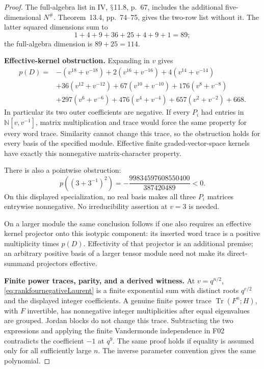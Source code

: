 \documentclass[11pt,a4paper]{article}
\renewcommand{\S}{\ensuremath{\mathsection}}
\newcommand{\fid}[1]{\textsf{#1}}\newcommand{\gate}[1]{\textsf{#1}}
\theoremstyle{named}\newtheorem{finding}{Finding}[section]
\theoremstyle{definition}\newtheorem{definition}[finding]{Definition}
\theoremstyle{remark}\newtheorem{remark}[finding]{Remark}
\begin{document}
\begin{proof}
The full-algebra list in IV, \S11.8, p.~67, includes
the additional five-dimensional \(N^\#\).
Theorem~13.4, pp.~74--75, gives the two-row list without it.
The latter squared dimensions sum to
\[
 1+4+9+36+25+4+9+1=89;
\]
the full-algebra dimension is \(89+25=114\).

\par\smallskip\noindent\textbf{Effective-kernel obstruction.}\quad
Expanding in \(v\) gives
\begin{equation}\label{eq:rankfournegativeLaurent}
\begin{split}
p(D)={}&-(v^{18}+v^{-18})+2(v^{16}+v^{-16})
 +4(v^{14}+v^{-14})\\
&+36(v^{12}+v^{-12})+67(v^{10}+v^{-10})
 +176(v^8+v^{-8})\\
&+297(v^6+v^{-6})+476(v^4+v^{-4})
 +657(v^2+v^{-2})+668.
\end{split}
\end{equation}
In particular its two outer coefficients are negative.
If every \(P_i\) had entries in
\(\mathbb N[v,v^{-1}]\), matrix multiplication and trace
would force the same property for every word trace.
Similarity cannot change this trace, so the obstruction
holds for every basis of the specified module.
Effective finite graded-vector-space kernels have exactly
this nonnegative matrix-character property.

There is also a pointwise obstruction:
\[
 p((3+3^{-1})^2)
 =-\frac{99834597608550400}{387420489}<0.
\]
On this displayed specialization, no real basis makes all
three \(P_i\) matrices entrywise nonnegative.
No irreducibility assertion at \(v=3\) is needed.

On a larger module the same conclusion follows if one also
requires an effective kernel projector onto this isotypic
component: its inserted word trace is a positive multiplicity
times \(p(D)\).
Effectivity of that projector is an additional premise;
an arbitrary positive basis of a larger tensor module
need not make its direct-summand projectors effective.

\par\smallskip\noindent\textbf{Finite power traces, parity, and a derived witness.}\quad
At \(v=q^{n/2}\),
\eqref{eq:rankfournegativeLaurent} is a finite exponential
sum with distinct roots \(q^{e/2}\) and the displayed
integer coefficients.
A genuine finite power trace
\(\operatorname{Tr}(F^n;H)\), with \(F\) invertible,
has nonnegative integer multiplicities after equal
eigenvalues are grouped. Jordan blocks do not change this
trace.
Subtracting the two expressions and applying the finite
Vandermonde independence in \fid{F02} contradicts the
coefficient \(-1\) at \(q^9\).
The same proof holds if equality is assumed only for
all sufficiently large \(n\).
The inverse parameter convention gives the same polynomial.


\end{proof}
\end{document}
